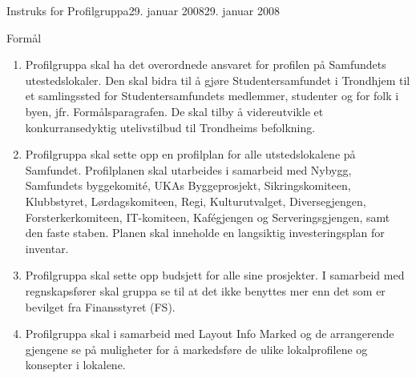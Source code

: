 \documentclass[../fsbok.tex]{subfiles}
\begin{document}
\begin{instruks}{Instruks for Profilgruppa}{29. januar 2008}{29. januar 2008}

    \begin{instruksledd}{Formål}
        \begin{enumerate}
            \item Profilgruppa skal ha det overordnede ansvaret for profilen på Samfundets utestedslokaler. Den skal bidra til å
gjøre Studentersamfundet i Trondhjem til et samlingssted for Studentersamfundets medlemmer, studenter og
for folk i byen, jfr. Formålsparagrafen. De skal tilby å videreutvikle et konkurransedyktig utelivstilbud til
Trondheims befolkning.
            \item  Profilgruppa skal sette opp en profilplan for alle utstedslokalene på Samfundet. Profilplanen skal utarbeides i
samarbeid med Nybygg, Samfundets byggekomité, UKAs Byggeprosjekt, Sikringskomiteen, Klubbstyret,
Lørdagskomiteen, Regi, Kulturutvalget, Diversegjengen, Forsterkerkomiteen, IT-komiteen, Kafégjengen og
Serveringsgjengen, samt den faste staben. Planen skal inneholde en langsiktig investeringsplan for inventar.
            \item Profilgruppa skal sette opp budsjett for alle sine prosjekter. I samarbeid med regnskapsfører skal gruppa se til
at det ikke benyttes mer enn det som er bevilget fra Finansstyret (FS).
            \item Profilgruppa skal i samarbeid med Layout Info Marked og de arrangerende gjengene se på muligheter for å
markedsføre de ulike lokalprofilene og konsepter i lokalene.
        \end{enumerate}
    \end{instruksledd}


\end{instruks}
\end{document}
